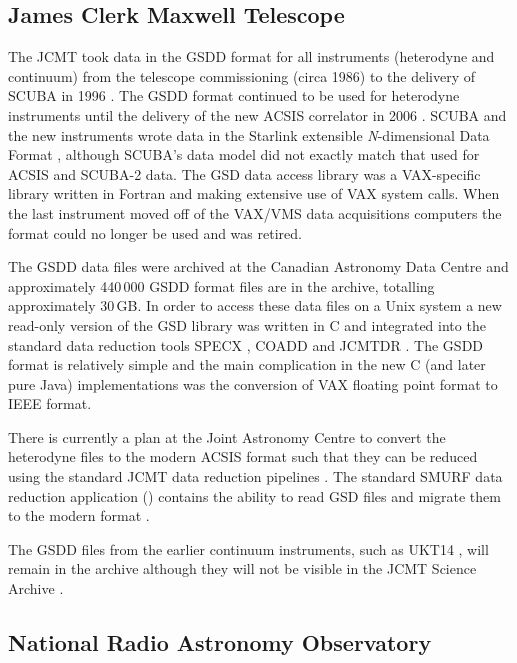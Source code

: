 \documentclass[final,authoryear,5p,times,twocolumn]{elsarticle}
\begin{document}
\subsection{James Clerk Maxwell Telescope}

The JCMT took data in the GSDD format for all instruments (heterodyne
and continuum) from the telescope commissioning (circa 1986) to the
delivery of SCUBA in 1996 \citep{1999MNRAS.303..659H}. The GSDD format
continued to be used for heterodyne instruments until the delivery of
the new ACSIS correlator in 2006 \citep{2009MNRAS.399.1026B}. SCUBA
and the new instruments wrote data in the Starlink extensible
\emph{N}-dimensional Data Format \citep[NDF;][]{2015NDF}, although
SCUBA's data model did not exactly match that used for ACSIS and
SCUBA-2 \citep{2013MNRAS.430.2513H} data. The GSD data access library
was a VAX-specific library \citep{1986QJRAS..27..675.,mtdn84} written
in Fortran and making extensive use of VAX system calls. When
the last instrument moved off of the VAX/VMS data acquisitions computers
the format could no longer be used and was retired.

The GSDD data files were archived at the Canadian Astronomy Data
Centre and approximately 440\,000 GSDD format files are in the
archive, totalling approximately 30\,GB. In order to access these data
files on a Unix system a new read-only version of the GSD library was
written in C \citep{SUN229} and integrated into the standard data
reduction tools SPECX \citep[][]{SPECX}, COADD
\citep[][]{COADD}  and JCMTDR
\citep[][]{SUN132}.  The GSDD format is relatively
simple and the main complication in the new C (and later pure Java)
implementations was the conversion of VAX floating point format to
IEEE format.

There is currently a plan at the Joint Astronomy Centre to convert the
heterodyne files to the modern ACSIS format such that they can be
reduced using the standard JCMT data reduction pipelines
\citep{2015ACSISDR}. The standard SMURF data reduction application
(\nocite{2013ascl.soft10007J}) contains the ability to
read GSD files and migrate them to the modern format \citep{SUN259}.

The GSDD files from the earlier continuum instruments, such as UKT14 \citep{1990MNRAS.243..126D}, will
remain in the archive although they will not be visible in the JCMT
Science Archive \citep{2015Economou}.

\subsection{National Radio Astronomy Observatory}
\end{document}
